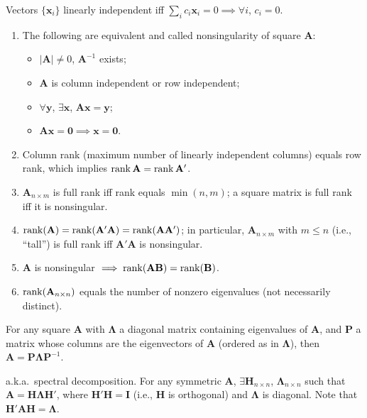 \documentclass[8pt,letterpaper, landscape]{extarticle} %
\newcommand{\mA}{\ensuremath{\mathbf{A}}}
\newcommand{\mB}{\ensuremath{\mathbf{B}}}
\newcommand{\mx}{\ensuremath{\mathbf{x}}}
\newcommand{\mI}{\ensuremath{\mathbf{I}}}
\newcommand{\mzero}{\ensuremath{\mathbf{0}}}
\begin{document}
\begin{multicols}{3}
\begin{description}
 Vectors $ \{ \mx_i \} $ linearly independent iff $ \sum_i c_i \mx_i = 0 \implies \forall i $, $ c_i = 0 $.
\begin{enumerate}
\item The following are equivalent and called nonsingularity of square $ \mA $:
\begin{itemize}
\item $ | \mA | \neq 0 $, $ \mA^{-1} $ exists;
\item $ \mA $ is column independent or row independent;
\item $ \forall \mathbf{y} $, $ \exists \mx $, $ \mA \mx = \mathbf{y} $;
\item $ \mA \mx = \mzero \implies \mx = \mzero $.
\end{itemize}
\item Column rank (maximum number of linearly independent columns) equals row rank, which implies $ \rank \mA = \rank \mA' $.
\item $ \mA_{n \times m} $ is full rank iff rank equals $ \min (n, m) $; a square matrix is full rank iff it is nonsingular.
\item $ \rank (\mA) = \rank (\mA' \mA) = \rank (\mA \mA') $; in particular, $ \mA_{n \times m} $ with $ m \leq n $ (i.e., ``tall'') is full rank iff $ \mA' \mA $ is nonsingular.
\item $ \mA $ is nonsingular $ \implies \rank (\mA \mB) = \rank (\mB) $.
\item $ \rank (\mA_{n \times n}) $ equals the number of nonzero eigenvalues (not necessarily distinct).
\end{enumerate}

 For any square $ \mA $ with $ \mathbf{\Lambda} $ a diagonal matrix containing eigenvalues of $ \mA $, and $ \mathbf{P} $ a matrix whose columns are the eigenvectors of $ \mA $ (ordered as in $ \mathbf{\Lambda} $), then $ \mA = \mathbf{P} \mathbf{\Lambda} \mathbf{P}^{-1} $.

 a.k.a.\ spectral decomposition. For any symmetric $ \mA $, $ \exists \mathbf{H}_{n \times n} $, $ \mathbf{\Lambda}_{n \times n} $ such that $ \mA = \mathbf{H} \mathbf{\Lambda} \mathbf{H}' $, where $ \mathbf{H}' \mathbf{H} = \mI $ (i.e., $ \mathbf{H} $ is orthogonal) and $ \mathbf{\Lambda} $ is diagonal. Note that $ \mathbf{H}' \mA \mathbf{H} = \mathbf{\Lambda} $.


\end{description}
\end{multicols}
\end{document}
